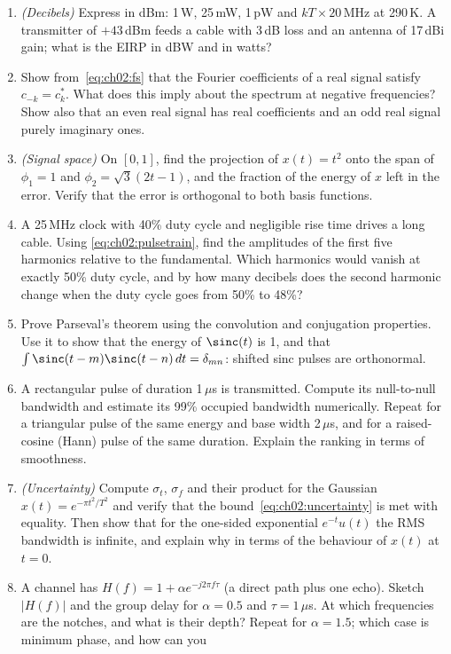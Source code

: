 \problems
\begin{enumerate}[label=\thechapter.\arabic*]
\item \emph{(Decibels)} Express in dBm: 1\,W, 25\,mW, 1\,pW and $kT\times20$\,MHz at 290\,K. A
transmitter of $+43$\,dBm feeds a cable with 3\,dB loss and an antenna of 17\,dBi gain; what is the
EIRP in dBW and in watts?
\item Show from~\eqref{eq:ch02:fs} that the Fourier coefficients of a real signal satisfy
$c_{-k}=c_k^*$. What does this imply about the spectrum at negative frequencies? Show also that an even
real signal has real coefficients and an odd real signal purely imaginary ones.
\item \emph{(Signal space)} On $[0,1]$, find the projection of $x(t)=t^2$ onto the span of $\phi_1=1$
and $\phi_2=\sqrt3(2t-1)$, and the fraction of the energy of $x$ left in the error. Verify that the error
is orthogonal to both basis functions.
\item A 25\,MHz clock with 40\% duty cycle and negligible rise time drives a long cable. Using
\eqref{eq:ch02:pulsetrain}, find the amplitudes of the first five harmonics relative to the fundamental.
Which harmonics would vanish at exactly 50\% duty cycle, and by how many decibels does the second
harmonic change when the duty cycle goes from 50\% to 48\%?
\item Prove Parseval's theorem using the convolution and conjugation properties. Use it to show that the
energy of $\sinc(t)$ is 1, and that $\int\sinc(t-m)\sinc(t-n)\,dt=\delta_{mn}$: shifted sinc pulses are
orthonormal.
\item A rectangular pulse of duration 1\,$\mu$s is transmitted. Compute its null-to-null bandwidth and
estimate its 99\% occupied bandwidth numerically. Repeat for a triangular pulse of the same energy and
base width 2\,$\mu$s, and for a raised-cosine (Hann) pulse of the same duration. Explain the ranking in
terms of smoothness.
\item \emph{(Uncertainty)} Compute $\sigma_t$, $\sigma_f$ and their product for the Gaussian
$x(t)=e^{-\pi t^2/T^2}$ and verify that the bound~\eqref{eq:ch02:uncertainty} is met with equality. Then
show that for the one-sided exponential $e^{-t}u(t)$ the RMS bandwidth is infinite, and explain why in
terms of the behaviour of $x(t)$ at $t=0$.
\item A channel has $H(f)=1+\alpha e^{-j2\pi f\tau}$ (a direct path plus one echo). Sketch
$|H(f)|$ and the group delay for $\alpha=0.5$ and $\tau=1\,\mu$s. At which frequencies are the
notches, and what is their depth? Repeat for $\alpha=1.5$; which case is minimum phase, and how can you

\end{enumerate}
